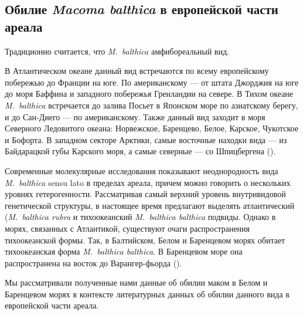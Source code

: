 

		\subsection{Обилие {\it Macoma balthica} в европейской части ареала}
Традиционно считается, что {\it M.~balthica} амфибореальный вид. 

В Атлантическом океане данный вид встречаются по всему европейскому побережью до Франции на юге. 
По американскому --- от штата Джорджия на юге до моря Баффина и западного побережья Гренландии на севере. 
В Тихом океане {\it M.~balthica} встречается до залива Посьет в Японском море по азиатскому берегу, и до Сан-Диего --- по американскому. 
Также данный вид заходит в моря Северного Ледовитого океана:  Норвежское, Баренцево, Белое, Карское, Чукотское и Бофорта. 
В западном секторе Арктики, самые восточные находки вида --- из Байдарацкой губы Карского моря, а самые северные --- со Шпицбергена (\cite{Semenova_1974, Kafanov_1985, Maximovich_1985, Meehan_1985, Naumov_Skorobogatov_1987, Meehan_et_al_1989, Hummel_et_al_1997}).

Современные молекулярные исследования показывают неоднородность вида {\it M.~balthica} sensu lato в пределах ареала, причем можно говорить о нескольких уровнях гетерогенности. 
Рассматривая самый верхний уровень внутривидовой генетической структуры, в настоящее время предлагают выделять атлантический ({\it M.~balthica rubra} и тихоокеанский {\it M.~balthica balthica} подвиды.
Однако  в морях, связанных с  Атлантикой, существуют очаги распространения тихоокеанской формы. 
Так, в Балтийском, Белом и Баренцевом морях обитает тихоокеанская форма {\it M.~balthica balthica}. В Баренцевом море она распространена на восток до Варангер-фьорда (\cite{Vainola_2003}). 

Мы рассматривали полученные нами данные об обилии маком в Белом и Баренцевом морях в контексте литературных данных об обилии данного вида в европейской части ареала.


